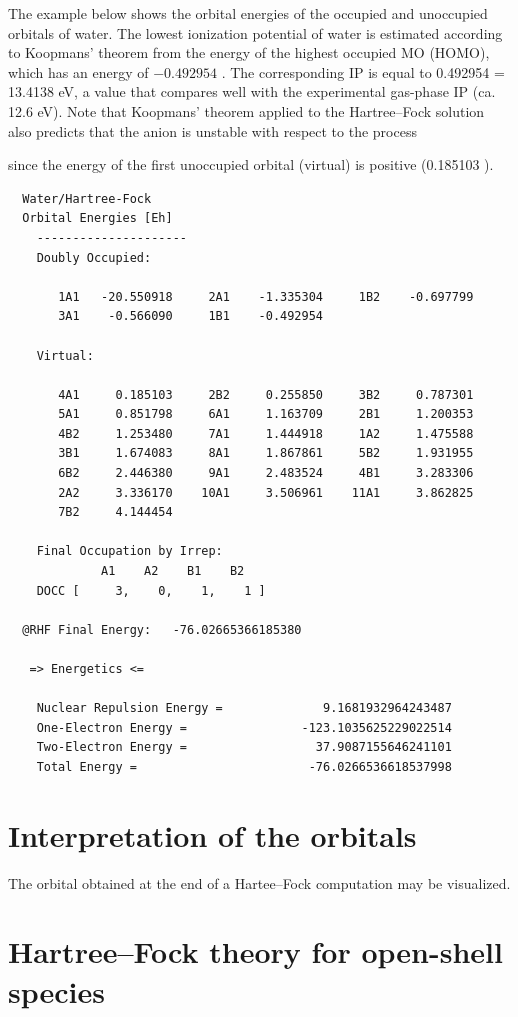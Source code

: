 \documentclass[../Main/chem371-notes.tex]{subfiles}
\begin{document}
The example below shows the orbital energies of the occupied and unoccupied orbitals of water.
The lowest ionization potential of water is estimated according to Koopmans' theorem from the energy of the highest occupied MO (HOMO), which has an energy of $-0.492954$ \Eh.
The corresponding IP is equal to 0.492954 \Eh = 13.4138 eV, a value that compares well with the experimental gas-phase IP (ca. 12.6 eV).
Note that Koopmans' theorem applied to the Hartree--Fock solution also predicts that the anion  is unstable with respect to the process
\begin{center}
\end{center}
since the energy of the first unoccupied orbital (virtual) is positive (0.185103 \Eh).
\begin{small}
\begin{verbatim}
  Water/Hartree-Fock
  Orbital Energies [Eh]
    ---------------------
    Doubly Occupied:                                                      

       1A1   -20.550918     2A1    -1.335304     1B2    -0.697799  
       3A1    -0.566090     1B1    -0.492954  

    Virtual:                                                              

       4A1     0.185103     2B2     0.255850     3B2     0.787301  
       5A1     0.851798     6A1     1.163709     2B1     1.200353  
       4B2     1.253480     7A1     1.444918     1A2     1.475588  
       3B1     1.674083     8A1     1.867861     5B2     1.931955  
       6B2     2.446380     9A1     2.483524     4B1     3.283306  
       2A2     3.336170    10A1     3.506961    11A1     3.862825  
       7B2     4.144454  

    Final Occupation by Irrep:
             A1    A2    B1    B2 
    DOCC [     3,    0,    1,    1 ]

  @RHF Final Energy:   -76.02665366185380

   => Energetics <=

    Nuclear Repulsion Energy =              9.1681932964243487
    One-Electron Energy =                -123.1035625229022514
    Two-Electron Energy =                  37.9087155646241101
    Total Energy =                        -76.0266536618537998
\end{verbatim}
\end{small}

\section{Interpretation of the orbitals}
The orbital obtained at the end of a Hartee--Fock computation may be visualized.

\section{Hartree--Fock theory for open-shell species}
\end{document}
